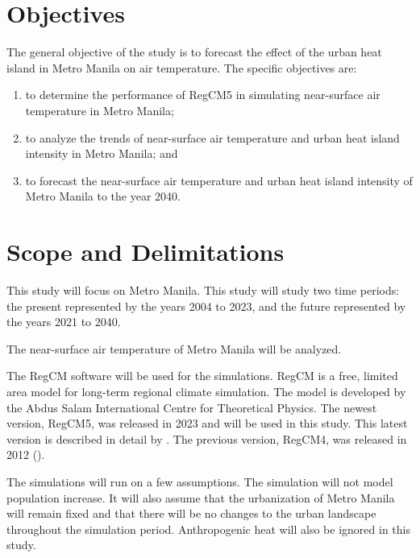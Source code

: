 \section{Objectives}
	The general objective of the study is to forecast the effect of the urban heat island in Metro Manila on air temperature.
	The specific objectives are:
	\begin{enumerate}
		\item to determine the performance of RegCM5 in simulating near-surface air temperature in Metro Manila;
		\item to analyze the trends of near-surface air temperature and urban heat island intensity in Metro Manila; and
		\item to forecast the near-surface air temperature and urban heat island intensity of Metro Manila to the year 2040.
		
	\end{enumerate}
	

\section{Scope and Delimitations}
	This study will focus on Metro Manila.
	This study will study two time periods: 
		the present represented by the years 2004 to 2023, 
		and the future represented by the years 2021 to 2040.
	
	The near-surface air temperature of Metro Manila will be analyzed.
	
	The RegCM software will be used for the simulations.
	RegCM is a free, limited area model for long-term regional climate simulation.
	The model is developed by the Abdus Salam International Centre for Theoretical Physics.
	The newest version, RegCM5, was released in 2023 and will be used in this study.
	This latest version is described in detail by \textcite{Giorgi2023}. 
	The previous version, RegCM4, was released in 2012 (\textcite{Giorgi2012}).
	
	The simulations will run on a few assumptions.
	The simulation will not model population increase.
	It will also assume that the urbanization of Metro Manila will remain fixed and that there will be no changes to the urban landscape throughout the simulation period.
	Anthropogenic heat will also be ignored in this study.